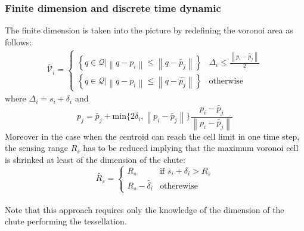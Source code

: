     \subsubsection{Finite dimension and discrete time dynamic}
    The finite dimension is taken into the picture by redefining the voronoi area as follows:
    \begin{gather}
        \tilde{\mathcal{V}_i} =
        \begin{cases} 
            \left\{ q \in \mathcal{Q} \lvert \left\lVert q-p_i \right\rVert \leq \left\lVert q-\tilde{p_j} \right\rVert\right\}  & \Delta_i \leq \frac{\left\lVert p_i - \tilde{p_j} \right\lVert}{2} \\
            \left\{ q \in \mathcal{Q} \lvert \left\lVert q-p_i \right\rVert \leq \left\lVert q-\hat{p_j} \right\rVert\right\} & \text{otherwise} 
        \end{cases} 
        \label{eq:voronoi_finite_dimensions}
    \end{gather}
    where $\Delta_i = s_i + \delta_{i}$ and
    \begin{equation}
        \hat{p_j} = \tilde{p_j} + \text{min}\{2 \delta_i, \left\lVert p_i - \tilde{p_j} \right\lVert\}\frac{p_i - \tilde{p_j}}{\left\lVert p_i - \tilde{p_j} \right\lVert}
    \end{equation}
    Moreover in the case when the centroid can reach the cell limit in one time step, the sensing range $R_s$ has to be reduced implying that the maximum voronoi cell is shrinked at least of the dimension of the chute:
    \begin{equation}
        \tilde{R_s} = 
        \begin{cases}
            R_s & \text{if } s_i + \delta_i > R_s\\
            R_s - \tilde{\delta_i} & \text{otherewise}
        \end{cases}
        \label{eq:rs}
    \end{equation}\\
    Note that this approach requires only the knowledge of the dimension of the chute performing the tessellation.

